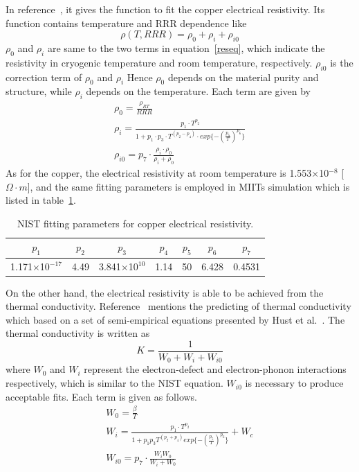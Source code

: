 In reference~\cite{nist}, it gives the function to fit the copper electrical resistivity.
Its function contains temperature and RRR dependence like
\begin{equation}
 \rho (T, RRR) = \rho_0 + \rho_i + \rho_{i0}
\end{equation}
$\rho_0$ and $\rho_i$ are same to the two terms in equation~\ref{reseq}, which indicate the resistivity in cryogenic temperature and room temperature, respectively.
$\rho_{i0}$ is the correction term of $\rho_0$ and $\rho_i$
Hence $\rho_0$ depends on the material purity and structure, while $\rho_i$ depends on the temperature.
Each term are given by
\begin{gather}
 \rho_0 = \frac{\rho_{RT}}{RRR} \\
 \rho_i = \frac{p_1 \cdot T^{p_2}}{1 + p_1 \cdot p_3 \cdot T^{(p_2-p_4)} \cdot exp\{-(\frac{p_5}{T})^{p_6}\}} \\
 \rho_{i0} = p_7 \cdot \frac{\rho_i \cdot \rho_0}{\rho_i + \rho_0}
\end{gather}
As for the copper, the electrical resistivity at room temperature is 1.553$\times$10$^{-8}$ [$\Omega\cdot m$], and the same fitting parameters is employed in MIITs simulation which is listed in table~\ref{cures}.
\begin{table}[H]
 \centering
 \begin{tabular}{ccccccc} \hline \hline
  $p_1$ & $p_2$ & $p_3$ & $p_4$ & $p_5$ & $p_6$ & $p_7$ \\ \hline
  1.171$\times$10$^{-17}$ & 4.49 & 3.841$\times$10$^{10}$ & 1.14 & 50 & 6.428 & 0.4531 \\ \hline \hline
 \end{tabular}
 \caption{NIST fitting parameters for copper electrical resistivity.}
 \label{cures}
\end{table}
On the other hand, the electrical resistivity is able to be achieved from the thermal conductivity.
Reference~\cite{wood} mentions the predicting of thermal conductivity which based on a set of semi-empirical equations presented by Hust et al.~\cite{hust}.
The thermal conductivity is written as
\begin{equation}
 K = \frac{1}{W_0 + W_i + W_{i0}}
\end{equation}
where $W_0$ and $W_i$ represent the electron-defect and electron-phonon interactions respectively, which is similar to the NIST equation.
$W_{i0}$ is necessary to produce acceptable fits.
Each term is given as follows.
\begin{gather}
 W_0 = \frac{\beta}{T} \\
 W_i = \frac{p_1 \cdot T^{p_2}}{1 + p_1p_3T^{(p_2+p_4)}exp\{-(\frac{p_5}{T})^{p_6}\}} + W_c \\
 W_{i0} = p_7 \cdot \frac{W_i W_0}{W_i + W_0}
\end{gather}
